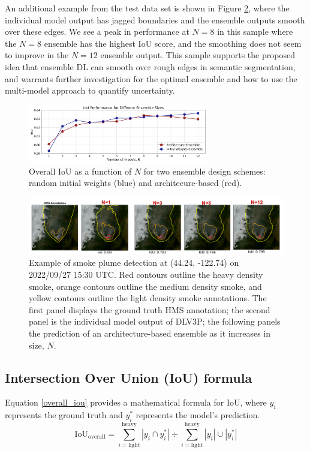 \documentclass{article}
\begin{document}
An additional example from the test data set is shown in Figure \ref{fig:smoothing_ex}, where the individual model output has jagged boundaries and the ensemble outputs smooth over these edges. We see a peak in performance at $N=8$ in this sample where the $N=8$ ensemble has the highest IoU score, and the smoothing does not seem to improve in the $N=12$ ensemble output. This sample supports the proposed idea that ensemble DL can smooth over rough edges in semantic segmentation, and warrants further investigation for the optimal ensemble and how to use the multi-model approach to quantify uncertainty. 
\begin{figure}
    \centering
    \includegraphics[width=0.70\textwidth]{ensemble_size_plot.png}
    \caption{\RaggedRight Overall IoU as a function of $N$ for two ensemble design schemes: random initial weights (blue) and architecure-based (red).}
    \label{fig:ensemble_size_plot}
\end{figure}

\begin{figure}[h]
    \centering
    \includegraphics[width=\textwidth]{smoothing_ex.png}
    \caption{Example of smoke plume detection at (44.24, -122.74) on 2022/09/27 15:30 UTC. Red contours outline the heavy density smoke, orange contours outline the medium density smoke, and yellow contours outline the light density smoke annotations. The first panel displays the ground truth HMS annotation; the second panel is the individual model output of DLV3P; the following panels the prediction of an architecture-based ensemble as it increases in size, $N$.}
    \label{fig:smoothing_ex}
\end{figure}

\subsection{Intersection Over Union (IoU) formula}
Equation \ref{overall_iou} provides a mathematical formula for IoU, where $y_{i}$ represents the ground truth and $y^*_{i}$ represents the model's prediction.
\begin{equation} \label{overall_iou}
    \text{IoU}_{\text{overall}} = {\sum\limits_{i=\text{light}}^{\text{heavy}}|y_{i}\cap y^*_{i}|} \div {\sum\limits_{i=\text{light}}^{\text{heavy}}|y_{i}|\cup|y^*_{i}|}
\end{equation}
\end{document}
